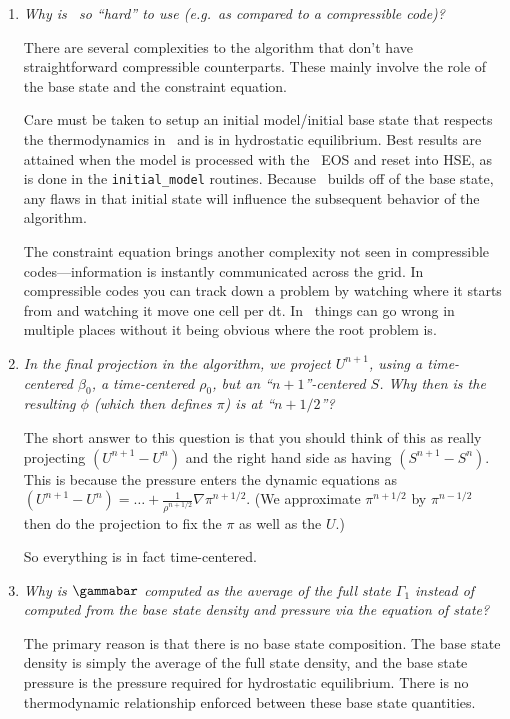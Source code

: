 \begin{enumerate}

\item {\em Why is \maestro\ so ``hard'' to use (e.g.\ as compared to a
  compressible code)?}

There are several complexities to the algorithm that don't have
straightforward compressible counterparts.  These mainly involve the
role of the base state and the constraint equation.

Care must be taken to setup an initial model/initial base state that
respects the thermodynamics in \maestro\ and is in hydrostatic equilibrium.
Best results are attained when the model is processed with the \maestro\
EOS and reset into HSE, as is done in the {\tt initial\_model} routines.
Because \maestro\ builds off of the base state, any flaws in that initial 
state will influence the subsequent behavior of the algorithm.

The constraint equation brings another complexity not seen in compressible
codes---information is instantly communicated
across the grid.  In compressible codes you can track down a problem by
watching where it starts from and watching it move one cell per dt.  In
\maestro\ things can go wrong in multiple places without it being obvious
where the root problem is.




\item {\em In the final projection in the algorithm, we project
  $U^{n+1}$, using a time-centered $\beta_0$, a time-centered $\rho_0$, but
  an ``$n+1$''-centered $S$.  Why then is the resulting $\phi$ (which then
  defines $\pi$) is at ``$n+1/2$''?}

  The short answer to this question is that you should think of this
  as really projecting  $(U^{n+1} - U^n)$ and the right hand side as having
  $(S^{n+1} - S^n)$.  This is because the pressure enters the dynamic equations as
  $(U^{n+1} - U^n) = \ldots + \frac{1}{\rho^{n+1/2}} \nabla \pi^{n+1/2}$.
  (We approximate $\pi^{n+1/2}$ by $\pi^{n-1/2}$ then do the projection to fix the
  $\pi$ as well as the $U$.)

  So everything is in fact time-centered.


\item {\em Why is $\gammabar$ computed as the average of the full state
       $\Gamma_1$ instead of computed from the base state density and 
       pressure via the equation of state?}

 The primary reason is that there is no base state composition.  The
 base state density is simply the average of the full state density,
 and the base state pressure is the pressure required for hydrostatic
 equilibrium.  There is no thermodynamic relationship enforced between
 these base state quantities.


\end{enumerate}
